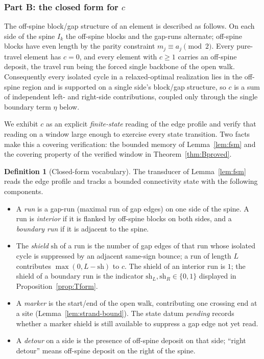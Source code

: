\documentclass[11pt]{article}
\theoremstyle{plain}
\theoremstyle{definition}
\newtheorem{definition}[theorem]{Definition}
\theoremstyle{remark}
\begin{document}
\subsubsection*{Part B: the closed form for $c$}

The off-spine block/gap structure of an element is described as follows. On
each side of the spine $I_k$ the off-spine blocks and the gap-runs alternate;
off-spine blocks have even length by the parity constraint
$m_j\equiv a_j\pmod2$. Every pure-travel element has $c=0$, and every element
with $c\ge1$ carries an off-spine deposit, the travel run being the forced
single backbone of the open walk. Consequently every isolated cycle in a
relaxed-optimal realization lies in the off-spine region and is supported on a
single side's block/gap structure, so $c$ is a sum of independent left- and
right-side contributions, coupled only through the single boundary term
$\eta$ below.

We exhibit $c$ as an explicit \emph{finite-state} reading of the edge profile
and verify that reading on a window large enough to exercise every state
transition. Two facts make this a covering verification: the bounded memory of
Lemma~\ref{lem:fsm} and the covering property of the verified window in
Theorem~\ref{thm:Bproved}.

\begin{definition}[Closed-form vocabulary]
\label{def:vocab}
The transducer of Lemma~\ref{lem:fsm} reads the edge profile and tracks a
bounded connectivity state with the following components.
\begin{itemize}
\item A \emph{run} is a gap-run (maximal run of gap edges) on one side of the
spine. A run is \emph{interior} if it is flanked by off-spine blocks on both
sides, and a \emph{boundary run} if it is adjacent to the spine.
\item The \emph{shield} $\mathrm{sh}$ of a run is the number of gap edges of
that run whose isolated cycle is suppressed by an adjacent same-sign bounce; a
run of length $L$ contributes $\max(0,L-\mathrm{sh})$ to $c$. The shield of an
interior run is $1$; the shield of a boundary run is the indicator
$\mathrm{sh}_L,\mathrm{sh}_R\in\{0,1\}$ displayed in
Proposition~\ref{prop:Tform}.
\item A \emph{marker} is the start/end of the open walk, contributing one
crossing end at a site (Lemma~\ref{lem:strand-bound}). The state datum
\emph{pending} records whether a marker shield is still available to suppress a
gap edge not yet read.
\item A \emph{detour} on a side is the presence of off-spine deposit on that
side; ``right detour'' means off-spine deposit on the right of the spine.
\end{itemize}
\end{definition}
\end{document}
